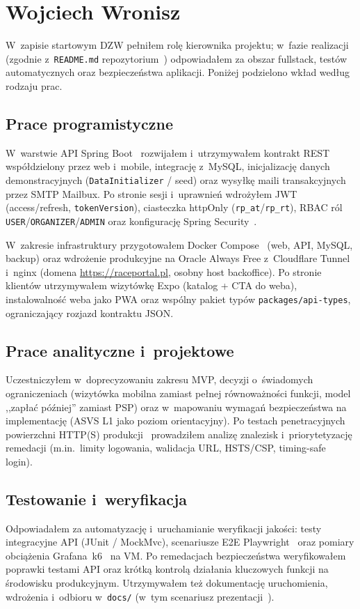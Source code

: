 \documentclass{sprz}
\begin{document}
\section{Wojciech Wronisz}
W~zapisie startowym DZW pełniłem rolę kierownika projektu; w~fazie realizacji (zgodnie z~\texttt{README.md} repozytorium~\cite{raceportal:repo}) odpowiadałem za obszar fullstack, testów automatycznych oraz bezpieczeństwa aplikacji. Poniżej podzielono wkład według rodzaju prac.

\subsection{Prace programistyczne}
W~warstwie API Spring Boot~\cite{spring:boot} rozwijałem i~utrzymywałem kontrakt REST współdzielony przez web i~mobile, integrację z~MySQL, inicjalizację danych demonstracyjnych (\texttt{DataInitializer} / seed) oraz wysyłkę maili transakcyjnych przez SMTP Mailbux. Po stronie sesji i~uprawnień wdrożyłem JWT~\cite{jwt:rfc} (access/refresh, \texttt{tokenVersion}), ciasteczka httpOnly (\texttt{rp\_at}/\texttt{rp\_rt}), RBAC ról \texttt{USER}/\texttt{ORGANIZER}/\texttt{ADMIN} oraz konfigurację Spring Security~\cite{spring:security}.

W~zakresie infrastruktury przygotowałem Docker Compose~\cite{docker:compose} (web, API, MySQL, backup) oraz wdrożenie produkcyjne na Oracle Always Free z~Cloudflare Tunnel~\cite{cloudflare:tunnel} i~nginx (domena \url{https://raceportal.pl}, osobny host backoffice). Po stronie klientów utrzymywałem wizytówkę Expo (katalog + CTA do weba), instalowalność weba jako PWA oraz wspólny pakiet typów \texttt{packages/api-types}, ograniczający rozjazd kontraktu JSON.

\subsection{Prace analityczne i~projektowe}
Uczestniczyłem w~doprecyzowaniu zakresu MVP, decyzji o~świadomych ograniczeniach (wizytówka mobilna zamiast pełnej równoważności funkcji, model ,,zapłać później'' zamiast PSP) oraz w~mapowaniu wymagań bezpieczeństwa na implementację (ASVS L1 jako poziom orientacyjny). Po testach penetracyjnych powierzchni HTTP(S) produkcji~\cite{raceportal:pentest} prowadziłem analizę znalezisk i~priorytetyzację remedacji (m.in.\ limity logowania, walidacja URL, HSTS/CSP, timing-safe login).

\subsection{Testowanie i~weryfikacja}
Odpowiadałem za automatyzację i~uruchamianie weryfikacji jakości: testy integracyjne API (JUnit / MockMvc), scenariusze E2E Playwright~\cite{playwright:docs} oraz pomiary obciążenia Grafana~k6~\cite{k6:docs,k6:vm-rps} na VM. Po remedacjach bezpieczeństwa weryfikowałem poprawki testami API oraz krótką kontrolą działania kluczowych funkcji na środowisku produkcyjnym. Utrzymywałem też dokumentację uruchomienia, wdrożenia i~odbioru w~\texttt{docs/} (w~tym scenariusz prezentacji~\cite{raceportal:demo}).
\end{document}
